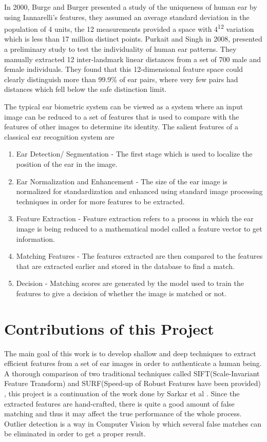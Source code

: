 In 2000, Burge and Burger\cite{burger} presented a study of the uniqueness of human ear by using Iannarelli's features, they assumed an average standard deviation in the population of 4 units, the 12 measurements provided a space with 4\textsuperscript{12} variation which is less than 17 million distinct points. Purkait and Singh \cite{purkait} in 2008, presented a preliminary study to test the individuality of human ear patterns. They manually extracted 12 inter-landmark linear distances from a set of 700 male and female individuals. They found that this 12-dimensional feature space could clearly distinguish more than 99.9{\%} of ear pairs, where very few pairs had distances which fell below the safe distinction limit.

The typical ear biometric system can be viewed as a system where an input image can be reduced to a set of features that is used to compare with the features of other images to determine its identity. The salient features of a classical ear recognition system are\cite{abaza} 

\begin{enumerate}
\item Ear Detection/ Segmentation - The first stage which is used to localize the position of the ear in the image.
\item Ear Normalization and Enhancement - The size of the ear image is normalized for standardization and enhanced using standard image processing techniques in order for more features to be extracted.
\item Feature Extraction - Feature extraction refers to a process in which the ear image is being reduced to a mathematical model called a feature vector to get information.
\item Matching Features - The features extracted are then compared to the features that are extracted earlier and stored in the database to find a match.
\item Decision - Matching scores are generated by the model used to train the features to give a decision of whether the image is matched or not.
\end{enumerate}



\section{Contributions of this Project} The main goal of this work is to develop
shallow and deep techniques to extract efficient features from a set of ear images in order to authenticate a human being. A thorough comparison of two traditional techniques called SIFT(Scale-Invariant Feature Transform) \cite{sift1} \cite{sift2} and SURF(Speed-up of Robust Features have been provided) \cite{surf}, this project is a continuation of the work done by Sarkar et al \cite{sarkar}. Since the extracted features are hand-crafted, there is quite a good amount of false matching and thus it may affect the true performance of the whole process. Outlier detection is a way in Computer Vision by which several false matches can be eliminated in order to get a proper result. 

